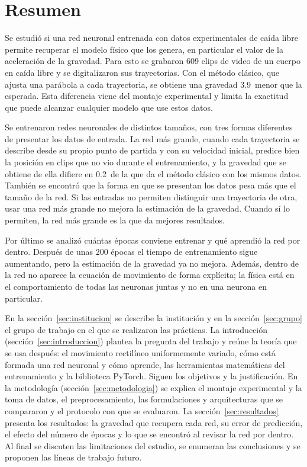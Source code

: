 \documentclass[titlepage,11pt]{article}
\providecommand{\SI}[2]{#1\,#2}
\providecommand{\percent}{\char37\relax}
\begin{document}
\pagestyle{empty}
\setcounter{page}{0}

\section*{Resumen}

Se estudió si una red neuronal entrenada con datos experimentales de caída
libre permite recuperar el modelo físico que los genera, en particular el valor
de la aceleración de la gravedad. Para esto se grabaron 609 clips de video de un
cuerpo en caída libre y se digitalizaron sus trayectorias. Con el método
clásico, que ajusta una parábola a cada trayectoria, se obtiene una gravedad
\SI{3.9}{\percent} menor que la esperada. Esta diferencia viene del montaje
experimental y limita la exactitud que puede alcanzar cualquier modelo que use
estos datos.

Se entrenaron redes neuronales de distintos tamaños, con tres formas diferentes
de presentar los datos de entrada. La red más grande, cuando cada trayectoria se
describe desde su propio punto de partida y con su velocidad inicial, predice
bien la posición en clips que no vio durante el entrenamiento, y la gravedad que
se obtiene de ella difiere en \SI{0.2}{\percent} de la que da el método clásico
con los mismos datos. También se encontró que la forma en que se presentan los
datos pesa más que el tamaño de la red. Si las entradas no permiten distinguir
una trayectoria de otra, usar una red más grande no mejora la estimación de la
gravedad. Cuando sí lo permiten, la red más grande es la que da mejores
resultados.

Por último se analizó cuántas épocas conviene entrenar y qué aprendió la red
por dentro. Después de unas 200 épocas el tiempo de entrenamiento sigue
aumentando, pero la estimación de la gravedad ya no mejora. Además, dentro de
la red no aparece la ecuación de movimiento de forma explícita; la física está
en el comportamiento de todas las neuronas juntas y no en una neurona en
particular.

En la sección~\ref{sec:institucion} se describe la institución y en la
sección~\ref{sec:grupo} el grupo de trabajo en el que se realizaron las
prácticas. La introducción (sección~\ref{sec:introduccion}) plantea la pregunta
del trabajo y reúne la teoría que se usa después: el movimiento rectilíneo
uniformemente variado, cómo está formada una red neuronal y cómo aprende, las
herramientas matemáticas del entrenamiento y la biblioteca PyTorch. Siguen los
objetivos y la justificación. En la metodología
(sección~\ref{sec:metodologia}) se explica el montaje experimental y la toma de
datos, el preprocesamiento, las formulaciones y arquitecturas que se compararon
y el protocolo con que se evaluaron. La sección~\ref{sec:resultados} presenta
los resultados: la gravedad que recupera cada red, su error de predicción, el
efecto del número de épocas y lo que se encontró al revisar la red por dentro.
Al final se discuten las limitaciones del estudio, se enumeran las conclusiones
y se proponen las líneas de trabajo futuro.
\end{document}

